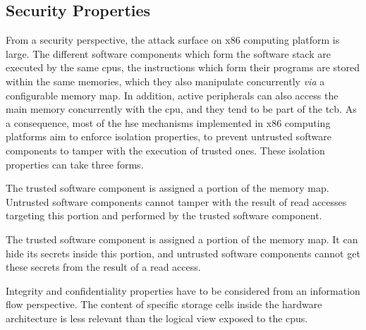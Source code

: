 \subsection{Security Properties}

From a security perspective, the attack surface on x86 computing platform is
large.
%
%
The different software components which form the software stack are executed by
the same \acp{cpu}, the instructions which form their programs are stored within
the same memories, which they also manipulate concurrently \emph{via} a
configurable memory map.
%
In addition, active peripherals can also access the main memory concurrently
with the \ac{cpu}, and they tend to be part of the \ac{tcb}.
%
%
As a consequence, most of the \ac{hse} mechanisms implemented in x86 computing
platforms aim to enforce isolation properties, to prevent untrusted software
 components to tamper with the
execution of trusted ones.
%
These isolation properties can take three forms.

\begin{definition}[Integrity]
  \label{def:usecase:int}
  The trusted software component is assigned a portion of the memory map.
  Untrusted software components cannot tamper with the result of read accesses
  targeting this portion and performed by the trusted software component.
\end{definition}

\begin{definition}[Confidentiality]
  The trusted software component is assigned a portion of the memory map.
  It can hide its secrets inside this portion, and untrusted software components
  cannot get these secrets from the result of a read access.
\end{definition}

Integrity and confidentiality properties have to be considered from an
information flow perspective.
%
The content of specific storage cells inside the hardware architecture is less
relevant than the logical view exposed to the \acp{cpu}.
%

